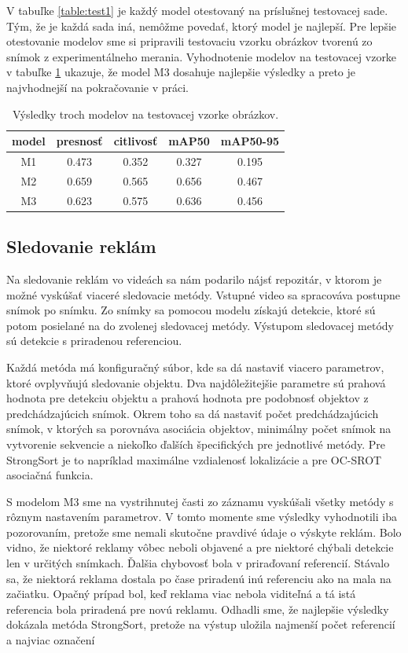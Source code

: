 V tabuľke \ref{table:test1} je každý model otestovaný na príslušnej testovacej sade. Tým, že je každá sada iná, nemôžme povedať, ktorý model je najlepší. Pre lepšie otestovanie modelov sme si pripravili testovaciu vzorku obrázkov tvorenú zo snímok z experimentálneho merania. Vyhodnotenie modelov na testovacej vzorke v tabuľke \ref{table:test2} ukazuje, že model M3 dosahuje najlepšie výsledky a preto je najvhodnejší na pokračovanie v práci.
\\
\begin{table}[ht]
\centering
\begin{tabular}{ |c c c c c|  }
\hline
model & presnosť & citlivosť & mAP50 & mAP50-95 \\ 
\hline
M1  & 0.473	& 0.352	& 0.327	& 0.195 \\
M2  & 0.659 & 0.565 & 0.656 & 0.467 \\
M3  & 0.623 & 0.575 & 0.636 & 0.456 \\
\hline
\end{tabular}
\caption{Výsledky troch modelov na testovacej vzorke obrázkov.}
\label{table:test2}
\end{table}


\subsection{Sledovanie reklám}

Na sledovanie reklám vo videách sa nám podarilo nájsť repozitár, v ktorom je možné vyskúšať viaceré sledovacie metódy. Vstupné video sa spracováva postupne snímok po snímku. Zo snímky sa pomocou modelu získajú detekcie, ktoré sú potom posielané na do zvolenej sledovacej metódy. Výstupom sledovacej metódy sú detekcie s priradenou referenciou.

Každá metóda má konfiguračný súbor, kde sa dá nastaviť viacero parametrov, ktoré ovplyvňujú sledovanie objektu. Dva najdôležitejšie parametre sú prahová hodnota pre detekciu objektu a prahová hodnota pre podobnosť objektov z predchádzajúcich snímok. Okrem toho sa dá nastaviť počet predchádzajúcich snímok, v ktorých sa porovnáva asociácia objektov, minimálny počet snímok na vytvorenie sekvencie a niekoľko ďalších špecifických pre jednotlivé metódy. Pre StrongSort je to napríklad maximálne vzdialenosť lokalizácie a pre OC-SROT asociačná funkcia.

S modelom M3 sme na vystrihnutej časti zo záznamu vyskúšali všetky metódy s rôznym nastavením parametrov. V tomto momente sme výsledky vyhodnotili iba pozorovaním, pretože sme nemali skutočne pravdivé údaje o výskyte reklám. Bolo vidno, že niektoré reklamy vôbec neboli objavené a pre niektoré chýbali detekcie len v určitých snímkach. Ďalšia chybovosť bola v priraďovaní referencií. Stávalo sa, že niektorá reklama dostala po čase priradenú inú referenciu ako na mala na začiatku. Opačný prípad bol, keď reklama viac nebola viditeľná a tá istá referencia bola priradená pre novú reklamu. Odhadli sme, že najlepšie výsledky dokázala metóda StrongSort, pretože na výstup uložila najmenší počet referencií a najviac označení

